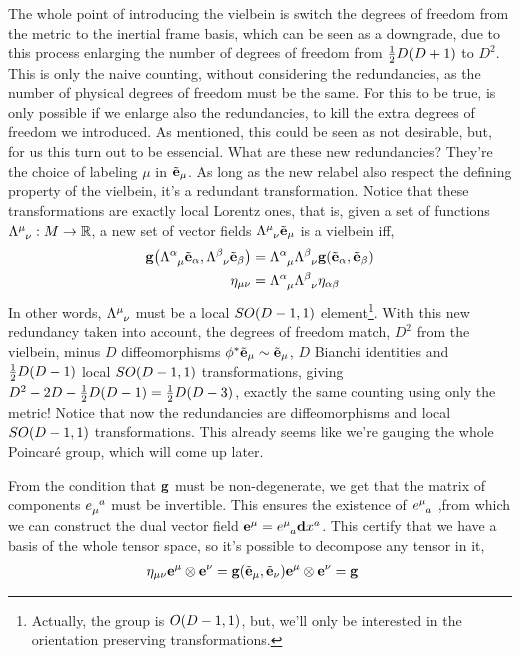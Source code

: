 The whole point of introducing the vielbein is switch the degrees of freedom from the 
metric to the inertial frame basis, which can be seen as a downgrade, due to this process enlarging the number of degrees of freedom from $\frac12D\qty(D+1)$ 
to $D^2$. This is only the naive counting, without considering the redundancies, as the number of physical degrees of freedom must be the same. 
For this to be true, is only possible if we enlarge also the redundancies, to kill the extra degrees of freedom we introduced. As mentioned, this could be seen as 
not desirable, but, for us this turn out to be essencial. What are these new redundancies? They're the choice of labeling $\mu$ in $\tilde{\vb e}_\mu$. As long as the 
new relabel also respect the defining property of the vielbein, it's a redundant transformation. Notice that these transformations are exactly local Lorentz ones, that is, 
given a set of functions $\tensor{\Lambda}{^\mu_\nu}:M\rightarrow\mathbb R$, a new set of vector fields $\tensor{\Lambda}{^\mu_\nu}\tilde{\vb e}_\mu$ is a vielbein iff, 
\begin{align*}
    \vb g\qty(\tensor{\Lambda}{^\alpha_\mu}\tilde{\vb e}_\alpha,\tensor{\Lambda}{^\beta_\nu}\tilde{\vb e}_\beta)&=\tensor{\Lambda}{^\alpha_\mu}\tensor{\Lambda}{^\beta_\nu}\vb g\qty(\tilde{\vb e}_\alpha,\tilde{\vb e}_\beta)\\
    \eta_{\mu\nu}&=\tensor{\Lambda}{^\alpha_\mu}\tensor{\Lambda}{^\beta_\nu}\eta_{\alpha\beta}
\end{align*}
In other words, $\tensor{\Lambda}{^\mu_\nu}$ must be a local $SO\qty(D-1,1)$ element\footnote{Actually, the group is $O\qty(D-1,1)$, but, we'll only be interested in the orientation preserving transformations.}. With this new redundancy taken into account, the degrees of freedom match, $D^2$ 
from the vielbein, minus $D$ diffeomorphisms $\phi^\ast\tilde{\vb e}_\mu\sim\tilde{\vb e}_\mu$, $D$ Bianchi identities and $\frac12D\qty(D-1)$ local $SO\qty(D-1,1)$ transformations, giving $D^2-2D-\frac12D\qty(D-1)=\frac12D\qty(D-3)$, exactly 
the same counting using only the metric! Notice that now the redundancies are diffeomorphisms and local $SO\qty(D-1,1)$ transformations. This already seems like we're gauging the whole Poincaré group, which will come up later.

From the condition that $\vb g$ must be non-degenerate, we get that the matrix of components $\tensor{e}{_\mu^a}$ must be invertible. This ensures 
the existence of $\tensor{e}{^\mu_a}$ ,from which we can construct the dual vector field $\vb e^\mu=\tensor{e}{^\mu_a}\vb d{x^a}$. This certify that 
we have a basis of the whole tensor space, so it's possible to decompose any tensor in it,
\begin{align*}
    \eta_{\mu\nu}\vb e^\mu\otimes\vb e^\nu&=\vb g\qty(\tilde{\vb e}_\mu,\tilde{\vb e}_\nu)\vb e^\mu\otimes\vb e^\nu=\vb g
\end{align*}

